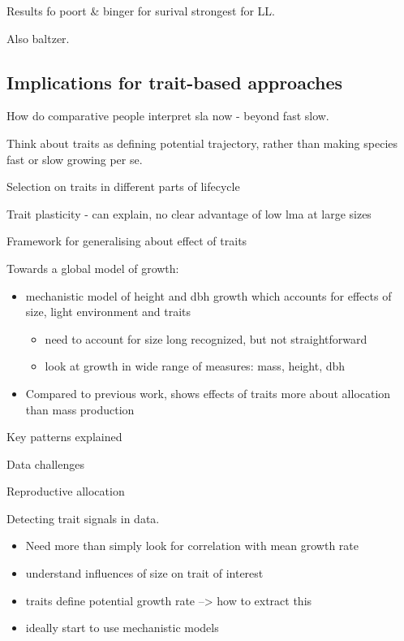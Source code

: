 \documentclass[a4paper,11pt]{article}
\begin{document}
Results fo poort \& binger for surival strongest for LL.

Also baltzer.

\subsection{Implications for trait-based approaches}

How do comparative people interpret sla now - beyond fast slow.

Think about traits as defining potential trajectory, rather than making
species fast or slow growing per se.

Selection on traits in different parts of lifecycle

Trait plasticity - can explain, no clear advantage of low lma at large
sizes

Framework for generalising about effect of traits


Towards a global model of growth:

\begin{itemize}
\itemsep1pt\parskip0pt
\item
  mechanistic model of height and dbh growth which accounts for effects
  of size, light environment and traits

  \begin{itemize}
  \itemsep1pt\parskip0pt
  \item
    need to account for size long recognized, but not straightforward
  \item
    look at growth in wide range of measures: mass, height, dbh
  \end{itemize}
\item
  Compared to previous work, shows effects of traits more about
  allocation than mass production
\end{itemize}


Key patterns explained

Data challenges

Reproductive allocation



Detecting trait signals in data.

\begin{itemize}
\item  Need more than simply look for correlation with mean growth rate
\item
  understand influences of size on trait of interest
\item
  traits define potential growth rate --\textgreater{} how to extract
  this
\item
  ideally start to use mechanistic models
\end{itemize}
\end{document}
